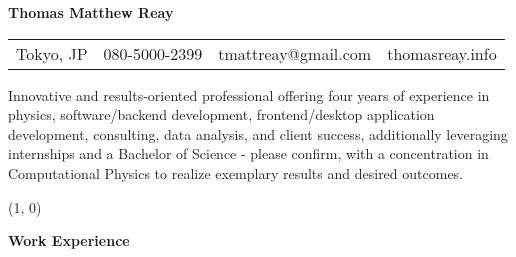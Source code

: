 \documentclass{article}
\newcommand{\heading}[1]{
	\vspace{8pt}
	\textbf{\large #1}
}
\begin{document}
\textbf{\huge Thomas Matthew Reay}

\vspace{4pt}

\begin{tabular*}{\textwidth}{l|l|l|l}
	\hline
	Tokyo, JP & 080-5000-2399 & tmattreay@gmail.com & thomasreay.info
	\rule{0pt}{12pt} \\
\end{tabular*}

\vspace{12pt}

Innovative and results-oriented professional offering four years of experience in physics, software/backend
development, frontend/desktop application development, consulting, data analysis, and client success,
additionally leveraging internships and a Bachelor of Science - please confirm, with a concentration in
Computational Physics to realize exemplary results and desired outcomes.

\line(1, 0){\textwidth}

\vspace{8pt}

\heading{Work Experience}
\end{document}
